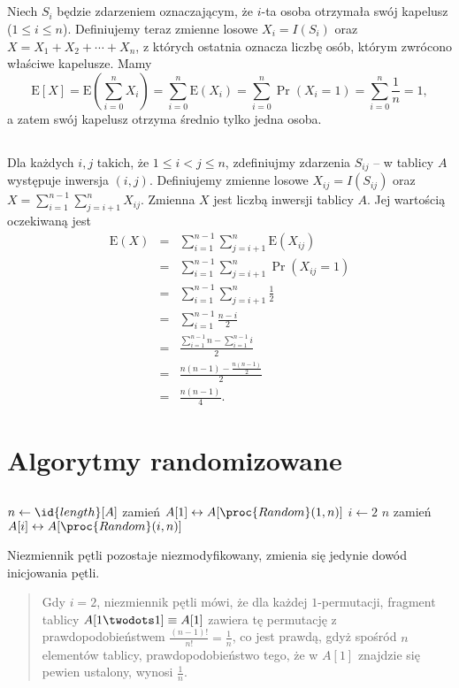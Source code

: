 \subsection{} %
Niech $S_i$ będzie zdarzeniem oznaczającym, że $i$-ta osoba otrzymała swój kapelusz ($1\le i\le n$). Definiujemy teraz zmienne losowe $X_i=I(S_i)$ oraz $X=X_1+X_2+\cdots+X_n$, z których ostatnia oznacza liczbę osób, którym zwrócono właściwe kapelusze. Mamy
\[
	\mathrm{E}[X] = \mathrm{E}\left(\sum_{i=0}^nX_i\right) = \sum_{i=0}^n\mathrm{E}(X_i) = \sum_{i=0}^n\Pr(X_i=1) = \sum_{i=0}^n\frac{1}{n} = 1,
\]
a zatem swój kapelusz otrzyma średnio tylko jedna osoba.

\subsection{} %
Dla każdych $i,j$ takich, że $1\le i<j\le n$, zdefiniujmy zdarzenia $S_{ij}$ -- w tablicy $A$ występuje inwersja $(i,j)$. Definiujemy zmienne losowe $X_{ij}=I(S_{ij})$ oraz $X=\sum_{i=1}^{n-1}\sum_{j=i+1}^nX_{ij}$. Zmienna $X$ jest liczbą inwersji tablicy $A$. Jej wartością oczekiwaną jest
\begin{eqnarray*}
	\mathrm{E}(X) &=& \sum_{i=1}^{n-1}\sum_{j=i+1}^n\mathrm{E}(X_{ij}) \\
	&=& \sum_{i=1}^{n-1}\sum_{j=i+1}^n\Pr(X_{ij}=1) \\
	&=& \sum_{i=1}^{n-1}\sum_{j=i+1}^n\frac{1}{2} \\
	&=& \sum_{i=1}^{n-1}\frac{n-i}{2} \\
	&=& \frac{\sum_{i=1}^{n-1}n-\sum_{i=1}^{n-1}i}{2} \\
	&=& \frac{n(n-1)-\frac{n(n-1)}{2}}{2} \\
	&=& \frac{n(n-1)}{4}.
\end{eqnarray*}

\section{Algorytmy randomizowane}

\subsection{} %
\begin{codebox}
\li	$n\gets\id{length}[A]$
\li	zamień $A[1]\leftrightarrow A[\proc{Random}(1,n)]$
\li	\For $i\gets 2$ \To $n$
\li		\Do
			zamień $A[i]\leftrightarrow A[\proc{Random}(i,n)]$
		\End
\end{codebox}
Niezmiennik pętli pozostaje niezmodyfikowany, zmienia się jedynie dowód inicjowania pętli.
\begin{quote}
	Gdy $i=2$, niezmiennik pętli mówi, że dla każdej $1$-permutacji, fragment tablicy $A[1\twodots 1]\equiv A[1]$ zawiera tę permutację z prawdopodobieństwem $\frac{(n-1)!}{n!}=\frac{1}{n}$, co jest prawdą, gdyż spośród $n$ elementów tablicy, prawdopodobieństwo tego, że w $A[1]$ znajdzie się pewien ustalony, wynosi $\frac{1}{n}$.
\end{quote}

